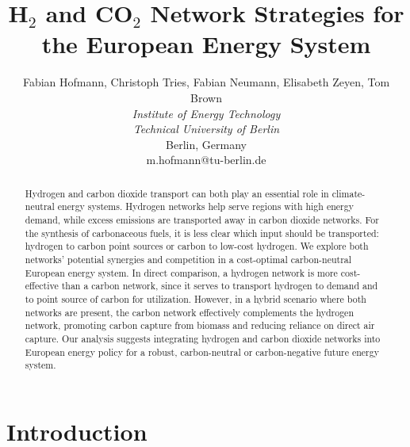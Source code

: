 \documentclass[twocolumn]{article}
\newcommand{\carbon}{CO$_2$}
\newcommand{\hydrogen}{H$_2$}
\begin{document}

\title{\hydrogen{} and \carbon{} Network Strategies for the European Energy System}



\author{
    Fabian Hofmann, Christoph Tries, Fabian Neumann, Elisabeth Zeyen, Tom Brown \\
    \textit{Institute of Energy Technology} \\
    \textit{Technical University of Berlin}\\
    Berlin, Germany \\
    m.hofmann@tu-berlin.de
}


\maketitle

\begin{abstract}
    Hydrogen and carbon dioxide transport can both play an essential role in climate-neutral energy systems. Hydrogen networks help serve regions with high energy demand, while excess emissions are transported away in carbon dioxide networks. For the synthesis of carbonaceous fuels, it is less clear which input should be transported: hydrogen to carbon point sources or carbon to low-cost hydrogen. We explore both networks' potential synergies and competition in a cost-optimal carbon-neutral European energy system. In direct comparison, a hydrogen network is more cost-effective than a carbon network, since it serves to transport hydrogen to demand and to point source of carbon for utilization. However, in a hybrid scenario where both networks are present, the carbon network effectively complements the hydrogen network, promoting carbon capture from biomass and reducing reliance on direct air capture. Our analysis suggests integrating hydrogen and carbon dioxide networks into European energy policy for a robust, carbon-neutral or carbon-negative future energy system.
\end{abstract}


\section{Introduction}
\end{document}
